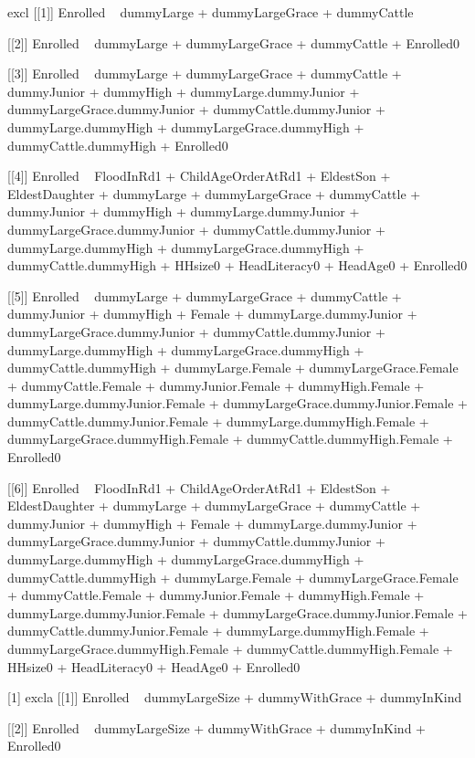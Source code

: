 \begin{Schunk}
\begin{Soutput}
[1] excl
[[1]]
Enrolled ~ dummyLarge + dummyLargeGrace + dummyCattle

[[2]]
Enrolled ~ dummyLarge + dummyLargeGrace + dummyCattle + Enrolled0

[[3]]
Enrolled ~ dummyLarge + dummyLargeGrace + dummyCattle + dummyJunior + 
    dummyHigh + dummyLarge.dummyJunior + dummyLargeGrace.dummyJunior + 
    dummyCattle.dummyJunior + dummyLarge.dummyHigh + dummyLargeGrace.dummyHigh + 
    dummyCattle.dummyHigh + Enrolled0

[[4]]
Enrolled ~ FloodInRd1 + ChildAgeOrderAtRd1 + EldestSon + EldestDaughter + 
    dummyLarge + dummyLargeGrace + dummyCattle + dummyJunior + 
    dummyHigh + dummyLarge.dummyJunior + dummyLargeGrace.dummyJunior + 
    dummyCattle.dummyJunior + dummyLarge.dummyHigh + dummyLargeGrace.dummyHigh + 
    dummyCattle.dummyHigh + HHsize0 + HeadLiteracy0 + HeadAge0 + 
    Enrolled0

[[5]]
Enrolled ~ dummyLarge + dummyLargeGrace + dummyCattle + dummyJunior + 
    dummyHigh + Female + dummyLarge.dummyJunior + dummyLargeGrace.dummyJunior + 
    dummyCattle.dummyJunior + dummyLarge.dummyHigh + dummyLargeGrace.dummyHigh + 
    dummyCattle.dummyHigh + dummyLarge.Female + dummyLargeGrace.Female + 
    dummyCattle.Female + dummyJunior.Female + dummyHigh.Female + 
    dummyLarge.dummyJunior.Female + dummyLargeGrace.dummyJunior.Female + 
    dummyCattle.dummyJunior.Female + dummyLarge.dummyHigh.Female + 
    dummyLargeGrace.dummyHigh.Female + dummyCattle.dummyHigh.Female + 
    Enrolled0

[[6]]
Enrolled ~ FloodInRd1 + ChildAgeOrderAtRd1 + EldestSon + EldestDaughter + 
    dummyLarge + dummyLargeGrace + dummyCattle + dummyJunior + 
    dummyHigh + Female + dummyLarge.dummyJunior + dummyLargeGrace.dummyJunior + 
    dummyCattle.dummyJunior + dummyLarge.dummyHigh + dummyLargeGrace.dummyHigh + 
    dummyCattle.dummyHigh + dummyLarge.Female + dummyLargeGrace.Female + 
    dummyCattle.Female + dummyJunior.Female + dummyHigh.Female + 
    dummyLarge.dummyJunior.Female + dummyLargeGrace.dummyJunior.Female + 
    dummyCattle.dummyJunior.Female + dummyLarge.dummyHigh.Female + 
    dummyLargeGrace.dummyHigh.Female + dummyCattle.dummyHigh.Female + 
    HHsize0 + HeadLiteracy0 + HeadAge0 + Enrolled0

[1] excla
[[1]]
Enrolled ~ dummyLargeSize + dummyWithGrace + dummyInKind

[[2]]
Enrolled ~ dummyLargeSize + dummyWithGrace + dummyInKind + Enrolled0


\end{Soutput}
\end{Schunk}
